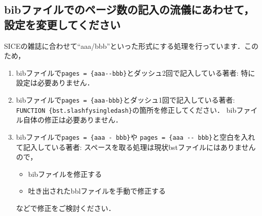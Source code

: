 \documentclass[a4j,fleqn,dvipdfmx,twocolumn]{jsarticle}
\begin{document}
\subsection{bibファイルでのページ数の記入の流儀にあわせて，設定を変更してください}
SICEの雑誌に合わせて``aaa/bbb''といった形式にする処理を行っています．このため，
\begin{enumerate}
	\item bibファイルで\verb+pages = {aaa--bbb}+とダッシュ2回で記入している著者:
	      特に設定は必要ありません．
	\item bibファイルで\verb+pages = {aaa-bbb}+とダッシュ1回で記入している著者:
	      \verb+FUNCTION {bst.slashfysingledash}+の箇所を修正してください．
	      bibファイル自体の修正は必要ありません．
	\item bibファイルで\verb+pages = {aaa - bbb}+や
	      \verb+pages = {aaa -- bbb}+と空白を入れて記入している著者:
	      スペースを取る処理は現状bstファイルにはありませんので，
	      \begin{itemize}
		      \item bibファイルを修正する
		      \item 吐き出されたbblファイルを手動で修正する
	      \end{itemize}
	      などで修正をご検討ください．
\end{enumerate}


\end{document}
